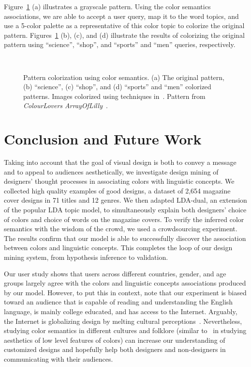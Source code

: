 \documentclass[prodmode,acmtochi]{acmsmall}
\begin{document}
Figure~\ref{pattern_colorization} (a) illustrates a grayscale pattern.
Using the color semantics associations, we are able to accept a user query, map it to the word topics, and use a 5-color palette as a representative of this color topic to colorize the original pattern.
Figures~\ref{pattern_colorization} (b), (c), and (d) illustrate the results of colorizing the original pattern using ``science'', ``shop'', and ``sports'' and ``men'' queries, respectively.


\begin{figure}[h!tb]\tiny
  \centering
   \ \
   \ \
   \ \
  \caption{Pattern colorization using color semantics. (a) The original pattern, (b) ``science'', (c) ``shop'', and (d) ``sports'' and ``men'' colorized patterns. Images colorized using techniques in~\protect\cite{2013-patternColoring}. Pattern from \emph{ColourLovers ArrayOfLilly}~\protect\cite{colourlovers}.}
  \label{pattern_colorization}
\end{figure}


\section{Conclusion and Future Work}
\label{sec:ConclusionAndFutureWork}

Taking into account that the goal of visual design is both to convey a
message and to appeal to audiences aesthetically, we investigate design
mining of designers' thought processes in associating colors with
linguistic concepts.  We collected high quality examples of good
designs, a dataset of 2,654 magazine cover designs in 71 titles and 12
genres.  We then adapted LDA-dual, an extension of the popular LDA topic
model, to simultaneously explain both designers' choice of colors
and choice of words on the magazine covers.  To verify the inferred color
semantics with the wisdom of the crowd, we used a crowdsourcing experiment.
The results confirm that our model is able to successfully discover the
association between colors and linguistic concepts.  This completes the
loop of our design mining system, from hypothesis inference to
validation.

Our user study shows that users across different countries, gender, and
age groups largely agree with the colors and linguistic concepts
associations produced by our model. However, to put this in context, note
that our experiment is biased toward an audience that is capable of
reading and understanding the English language, is mainly college educated, and has
access to the Internet. Arguably, the Internet is globalizing design by
melting cultural perceptions~\cite{carroll2007art}.
Nevertheless, studying color semantics in different cultures and
folklore (similar to~\cite{reinecke2014} in studying aesthetics of low level features of colors) can increase our understanding of customized designs and
hopefully help both designers and non-designers in communicating with
their audiences.
\end{document}
